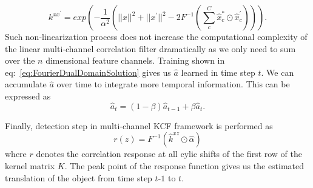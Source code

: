 \documentclass[10pt,twocolumn,letterpaper]{article}
\begin{document}
\begin{equation}
k^{xx^{'}} = exp(-\dfrac{1}{\alpha^{2}}(||x||^{2}+||x^{'}||^{2}-2F^{-1}(\sum^{C}_{c}\hat{x}_{c}^{*}\odot \hat{x}_{c}^{'}))).
\label{eq:GaussianCorrelationSingleChannel}
\end{equation}
Such non-linearization process does not increase the computational complexity of the linear multi-channel correlation filter dramatically as we only need to sum over the $n$ dimensional feature channels. Training shown in eq:~\ref{eq:FourierDualDomainSolution} gives us $\hat{a}$ learned in time step $t$. We can accumulate $\hat{a}$ over time to integrate more temporal information. This can be expressed as
\begin{equation}
\hat{a}_{t} = (1-\beta)\hat{a}_{t-1} + \beta\hat{a}_{t}. 
\end{equation}

Finally, detection step in multi-channel KCF framework is performed as
\begin{equation}
r(z) = F^{-1}(\hat{k}^{xz} \odot \hat{\alpha})
\end{equation}
where $r$ denotes the correlation response at all cylic shifts of the first row of the kernel matrix $K$. The peak point of the response function gives us the estimated translation of the object from time step $t$-$1$ to $t$.
\end{document}
